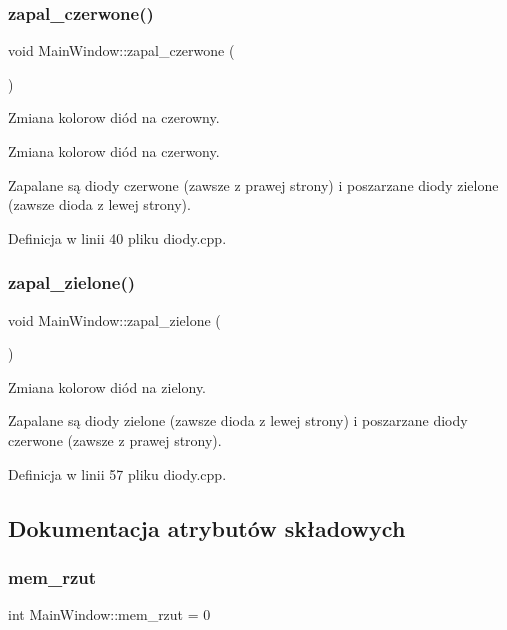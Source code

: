 \subsubsection{\texorpdfstring{zapal\+\_\+czerwone()}{zapal\_czerwone()}}
{\footnotesize\ttfamily void Main\+Window\+::zapal\+\_\+czerwone (\begin{DoxyParamCaption}{ }\end{DoxyParamCaption})}



Zmiana kolorow diód na czerowny. 

Zmiana kolorow diód na czerwony.

Zapalane są diody czerwone (zawsze z prawej strony) i poszarzane diody zielone (zawsze dioda z lewej strony). 

Definicja w linii 40 pliku diody.\+cpp.

\mbox{\label{class_main_window_a24aadb4c1aaf83ce170dcf849ec6aa51}} 
\subsubsection{\texorpdfstring{zapal\+\_\+zielone()}{zapal\_zielone()}}
{\footnotesize\ttfamily void Main\+Window\+::zapal\+\_\+zielone (\begin{DoxyParamCaption}{ }\end{DoxyParamCaption})}



Zmiana kolorow diód na zielony. 

Zapalane są diody zielone (zawsze dioda z lewej strony) i poszarzane diody czerwone (zawsze z prawej strony). 

Definicja w linii 57 pliku diody.\+cpp.



\subsection{Dokumentacja atrybutów składowych}
\mbox{\label{class_main_window_a7801ba2425266ceee18c478629a27186}} 
\subsubsection{\texorpdfstring{mem\+\_\+rzut}{mem\_rzut}}
{\footnotesize\ttfamily int Main\+Window\+::mem\+\_\+rzut = 0}


